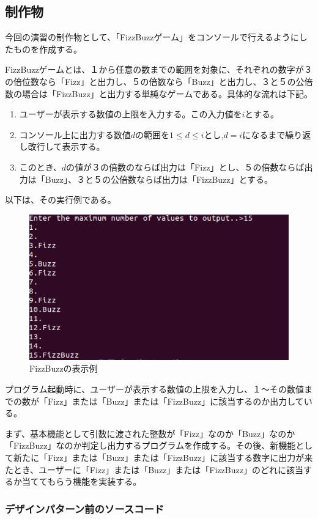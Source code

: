 \documentclass[dvipdfmx]{jsarticle}
\begin{document}
\subsection{制作物}
今回の演習の制作物として、「FizzBuzzゲーム」をコンソールで行えるようにしたものを作成する。\par
FizzBuzzゲームとは、１から任意の数までの範囲を対象に、それぞれの数字が３の倍位数なら「Fizz」と出力し、５の倍数なら「Buzz」と出力し、３と５の公倍数の場合は「FizzBuzz」と出力する単純なゲームである。具体的な流れは下記。
\begin{enumerate}
  \item ユーザーが表示する数値の上限を入力する。この入力値を$i$とする。
  \item コンソール上に出力する数値$d$の範囲を$1 \leq d \leq i$とし,$d = i$になるまで繰り返し改行して表示する。
  \item このとき、$d$の値が３の倍数のならば出力は「Fizz」とし、５の倍数ならば出力は「Buzz」、３と５の公倍数ならば出力は「FizzBuzz」とする。
\end{enumerate}
以下は、その実行例である。
\begin{figure}[H]
  \centering
  \includegraphics[scale=0.6]{ImgMovies/FizzBuzzEx.png}
  \caption{FizzBuzzの表示例}
\end{figure}
プログラム起動時に、ユーザーが表示する数値の上限を入力し、１〜その数値までの数が「Fizz」または「Buzz」または「FizzBuzz」に該当するのか出力している。\par
まず、基本機能として引数に渡された整数が「Fizz」なのか「Buzz」なのか「FizzBuzz」なのか判定し出力するプログラムを作成する。その後、新機能として新たに「Fizz」または「Buzz」または「FizzBuzz」に該当する数字に出力が来たとき、ユーザーに「Fizz」または「Buzz」または「FizzBuzz」のどれに該当するか当ててもらう機能を実装する。\par
\subsubsection{デザインパターン前のソースコード}
\end{document}
